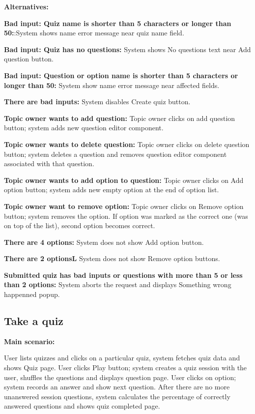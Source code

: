 \documentclass[
    english, %
]{VUMIFPSkursinis}
\begin{document}
\noindent\textbf{\fontsize{13}{15}\selectfont Alternatives:}

\textbf{Bad input: Quiz name is shorter than 5 characters or longer than 50:}:System shows name error message near quiz name field.

\textbf{Bad input: Quiz has no questions:} System shows No questions text near Add question button.

\textbf{Bad input: Question or option name is shorter than 5 characters or longer than 50:} System show name error message near affected fields.

\textbf{There are bad inputs:} System disables Create quiz button.

\textbf{Topic owner wants to add question:} Topic owner clicks on add question button; system adds new question editor component.

\textbf{Topic owner wants to delete question:} Topic owner clicks on delete question button; system deletes a question and removes question editor component associated with that question.

\textbf{Topic owner wants to add option to question:} Topic owner clicks on Add option button; system adds new empty option at the end of option list.

\textbf{Topic owner want to remove option:} Topic owner clicks on Remove option button; system removes the option. If option was marked as the correct one (was on top of the list), second option becomes correct.

\textbf{There are 4 options:} System does not show Add option button.

\textbf{There are 2 optionsL} System does not show Remove option buttons.

\textbf{Submitted quiz has bad inputs or questions with more than 5 or less than 2 options:} System aborts the request and displays Something wrong happenned popup.

\subsection{Take a quiz}

\noindent\textbf{\fontsize{13}{15}\selectfont Main scenario:}

User lists quizzes and clicks on a particular quiz, system fetches quiz data and shows Quiz page. User clicks Play button; system creates a quiz session with the user, shuffles the questions and displays question page. User clicks on option; system records an answer and show next question. After there are no more unanswered session questions, system calculates the percentage of correctly answered questions and shows quiz completed page.
\end{document}
